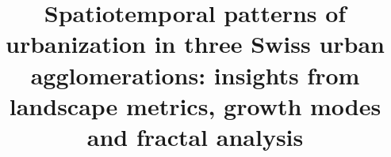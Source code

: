 %
%
%
%
%
%
\RequirePackage{fix-cm}
%
\documentclass[smallextended, natbib]{svjour3}       %
%
\smartqed  %
%
\usepackage{graphicx}

%
%
\usepackage[misc]{ifsym} %
\usepackage{nameref,hyperref}
\usepackage{booktabs}
\usepackage{changepage}

\newcommand{\mycitet}[1]{\citetalias{#1} (\citeyear{#1})}
\newcommand{\mycitep}[1]{(\citetalias{#1} \citeyear{#1})}

%




\title{Spatiotemporal patterns of urbanization in three Swiss urban agglomerations: insights from landscape metrics, growth modes and fractal analysis%
}

